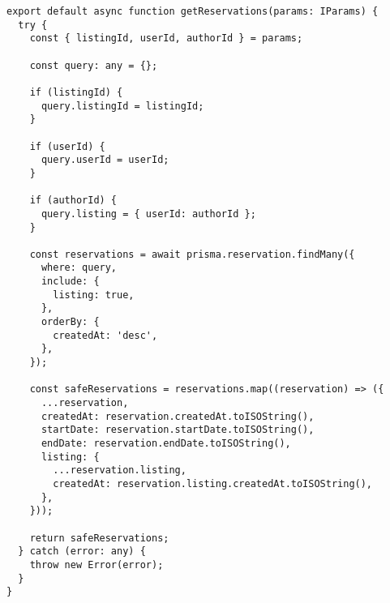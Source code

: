 \begin{verbatim}
export default async function getReservations(params: IParams) {
  try {
    const { listingId, userId, authorId } = params;

    const query: any = {};

    if (listingId) {
      query.listingId = listingId;
    }

    if (userId) {
      query.userId = userId;
    }

    if (authorId) {
      query.listing = { userId: authorId };
    }

    const reservations = await prisma.reservation.findMany({
      where: query,
      include: {
        listing: true,
      },
      orderBy: {
        createdAt: 'desc',
      },
    });

    const safeReservations = reservations.map((reservation) => ({
      ...reservation,
      createdAt: reservation.createdAt.toISOString(),
      startDate: reservation.startDate.toISOString(),
      endDate: reservation.endDate.toISOString(),
      listing: {
        ...reservation.listing,
        createdAt: reservation.listing.createdAt.toISOString(),
      },
    }));

    return safeReservations;
  } catch (error: any) {
    throw new Error(error);
  }
}
\end{verbatim}